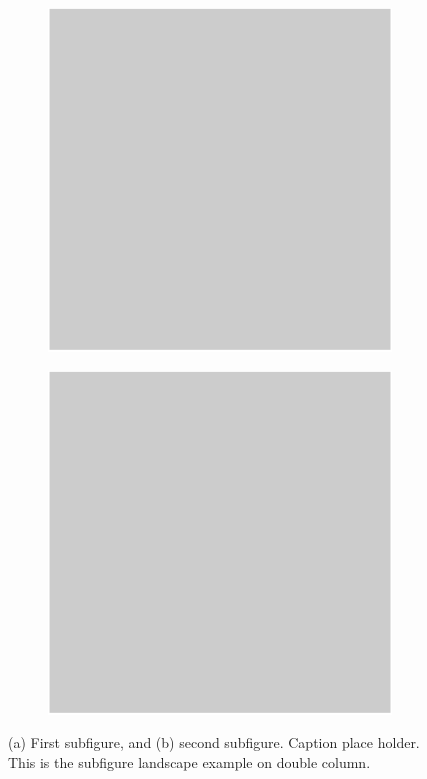 \documentclass[a4paper,fleqn]{cas-dc}
\begin{document}
\begin{figure}
	\begin{subfigure}[t]{.5\textwidth}\centering
		\includegraphics[width=.5\columnwidth]{figs/Fig1.pdf}
		\caption{}						%
	\end{subfigure}%
	\begin{subfigure}[t]{.5\textwidth}\centering
		\includegraphics[width=.5\columnwidth]{figs/Fig1.pdf}
		\caption{}						%
	\end{subfigure}
\caption{(a) First subfigure, and (b) second subfigure. Caption place holder. This is the subfigure landscape example on double column.}
\label{FIG:2}
\end{figure}
\end{document}
